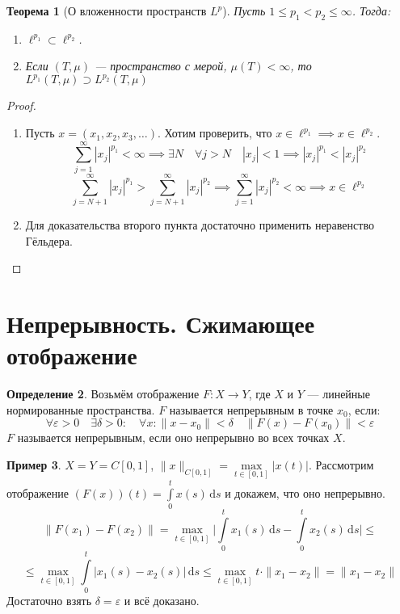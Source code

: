 \documentclass[11pt,openany,a4paper]{scrartcl}
\theoremstyle{plain}
\newtheorem{theorem}{Теорема}[section]
\theoremstyle{definition}
\newtheorem{definition}[theorem]{Определение}
\newtheorem{example}[theorem]{Пример}
\newcommand{\dif}{\, \mathrm d}
\begin{document}
\begin{theorem}[О вложенности пространств $L^p$]
Пусть $1 \leqslant p_1 < p_2 \leqslant \infty$. Тогда:
    \begin{enumerate}
        \item $\ell^{p_1} \subset \ell^{p_2}$.
        \item Если $(T, \mu)$ — пространство с мерой, $\mu(T) < \infty$, то
        $L^{p_1}(T, \mu) \supset L^{p_2}(T, \mu)$
    \end{enumerate}
\end{theorem}
\pagebreak
\begin{proof}
\mbox{}
    \begin{enumerate}
        \item Пусть $x = (x_1, x_2, x_3, \ldots)$. Хотим проверить, что
        $x \in \ell^{p_1} \implies x \in \ell^{p_2}$.
        $$
        \sum\limits_{j = 1}^\infty |x_j|^{p_1} < \infty \implies
        \exists N\quad \forall j > N\quad |x_j| < 1 \implies
        |x_j|^{p_1} < |x_j|^{p_2}
        $$
        $$
        \sum\limits_{j = N + 1}^\infty |x_j|^{p_1} >
        \sum\limits_{j = N + 1}^\infty |x_j|^{p_2} \implies
        \sum\limits_{j = 1}^\infty |x_j|^{p_2} < \infty \implies x \in \ell^{p_2}
        $$
        \item Для доказательства второго пункта достаточно применить неравенство 
        Гёльдера.
    \end{enumerate}
\end{proof}

\section{Непрерывность. Сжимающее отображение}

\begin{definition}
    Возьмём отображение $F: X \to Y$, где $X$ и $Y$ — линейные нормированные
    пространства. $F$ называется непрерывным в точке $x_0$, если:
    $$
    \forall \varepsilon > 0\quad
    \exists \delta > 0:\quad \forall x: \|x - x_0\| < \delta\quad
    \|F(x) -F(x_0)\| < \varepsilon
    $$
    $F$ называется непрерывным, если оно непрерывно во всех точках $X$.
\end{definition}

\begin{example}
        $X = Y = C[0, 1]$, $\|x\|_{C[0, 1]} =
        \max\limits_{t \in [0, 1]} |x(t)|$. Рассмотрим отображение
        $(F(x))(t) = \int\limits_0^t x(s)\dif s$ и докажем, что оно 
        непрерывно.
        $$
        \|F(x_1) - F(x_2)\| = \max_{t \in [0, 1]}
        \bigg|\int\limits_0^t x_1(s)\dif s - \int\limits_0^t x_2(s)\dif s\bigg|
        \leqslant
        $$
        $$
        \leqslant
        \max_{t \in [0, 1]} \int\limits_0^t |x_1(s) - x_2(s)|\dif s \leqslant
        \max_{t \in [0, 1]} t \cdot \|x_1 - x_2\| = \|x_1 - x_2\|
        $$
        Достаточно взять $\delta = \varepsilon$ и всё доказано.
\end{example}
\end{document}
